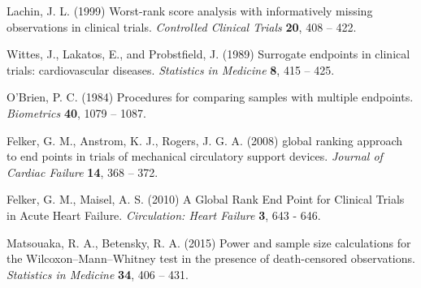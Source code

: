 \documentclass[bimj,fleqn]{w-art}\usepackage[]{graphicx}\usepackage[]{color}
\theoremstyle{plain}
\theoremstyle{definition}
\begin{document}
  \begin{thebibliography}{10}

  Lachin, J. L. (1999) Worst-rank score analysis with informatively missing observations in clinical trials.  \textit{Controlled Clinical Trials} \textbf{20}, 408 – 422.

  Wittes, J., Lakatos, E., and Probstfield, J. (1989) Surrogate endpoints in clinical trials: cardiovascular diseases. \textit{Statistics in Medicine} \textbf{8}, 415 – 425.

   O'Brien, P. C. (1984) Procedures for comparing samples with multiple endpoints. \textit{Biometrics} \textbf{40}, 1079 – 1087.

 Felker, G. M., Anstrom, K. J., Rogers, J. G. A. (2008) global ranking approach to end points in trials of mechanical circulatory support devices. \textit{Journal of Cardiac Failure} \textbf{14}, 368 – 372.

 Felker, G. M., Maisel, A. S. (2010) A Global Rank End Point for Clinical Trials in Acute Heart Failure. \textit{Circulation: Heart Failure} \textbf{3}, 643 - 646.

 Matsouaka, R. A., Betensky, R. A. (2015) Power and sample size calculations for the Wilcoxon–Mann–Whitney test in the presence of death-censored observations. \textit{Statistics in Medicine} \textbf{34}, 406 – 431.


  \end{thebibliography}
  \newpage
  \phantom{aaaa}
  
\end{document}
